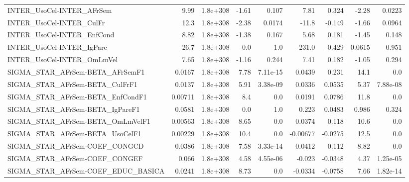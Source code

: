 \begin{tabular}{lrrrrrrrr}
INTER\_UsoCel-INTER\_AFrSem             &        9.99 &     1.8e+308 &    -1.61 &    0.107 &       7.81 &       0.324 &        -2.28 &        0.0223 \\
INTER\_UsoCel-INTER\_CulFr              &        12.3 &     1.8e+308 &    -2.38 &   0.0174 &      -11.8 &      -0.149 &        -1.66 &        0.0964 \\
INTER\_UsoCel-INTER\_EnfCond            &        8.82 &     1.8e+308 &    -1.38 &    0.167 &       5.68 &       0.181 &        -1.45 &         0.148 \\
INTER\_UsoCel-INTER\_IgPare             &        26.7 &     1.8e+308 &      0.0 &      1.0 &     -231.0 &      -0.429 &       0.0615 &         0.951 \\
INTER\_UsoCel-INTER\_OmLmVel            &        7.65 &     1.8e+308 &    -1.16 &    0.244 &       7.41 &       0.182 &        -1.05 &         0.294 \\
SIGMA\_STAR\_AFrSem-BETA\_AFrSemF1       &      0.0167 &     1.8e+308 &     7.78 & 7.11e-15 &     0.0439 &       0.231 &         14.1 &           0.0 \\
SIGMA\_STAR\_AFrSem-BETA\_CulFrF1        &      0.0137 &     1.8e+308 &     5.91 & 3.38e-09 &     0.0336 &      0.0535 &         5.37 &      7.88e-08 \\
SIGMA\_STAR\_AFrSem-BETA\_EnfCondF1      &     0.00711 &     1.8e+308 &      8.4 &      0.0 &     0.0191 &      0.0786 &         11.8 &           0.0 \\
SIGMA\_STAR\_AFrSem-BETA\_IgPareF1       &      0.0581 &     1.8e+308 &      0.0 &      1.0 &      0.223 &      0.0483 &        0.986 &         0.324 \\
SIGMA\_STAR\_AFrSem-BETA\_OmLmVelF1      &     0.00563 &     1.8e+308 &     8.65 &      0.0 &     0.0374 &       0.118 &         10.6 &           0.0 \\
SIGMA\_STAR\_AFrSem-BETA\_UsoCelF1       &     0.00229 &     1.8e+308 &     10.4 &      0.0 &   -0.00677 &     -0.0275 &         12.5 &           0.0 \\
SIGMA\_STAR\_AFrSem-COEF\_CONGCD         &      0.0386 &     1.8e+308 &     7.58 & 3.33e-14 &     0.0412 &       0.112 &         8.82 &           0.0 \\
SIGMA\_STAR\_AFrSem-COEF\_CONGEF         &       0.066 &     1.8e+308 &     4.58 & 4.55e-06 &     -0.023 &     -0.0348 &         4.37 &      1.25e-05 \\
SIGMA\_STAR\_AFrSem-COEF\_EDUC\_BASICA    &      0.0241 &     1.8e+308 &     8.73 &      0.0 &    -0.0334 &     -0.0758 &         7.66 &      1.82e-14 \\

\end{tabular}
